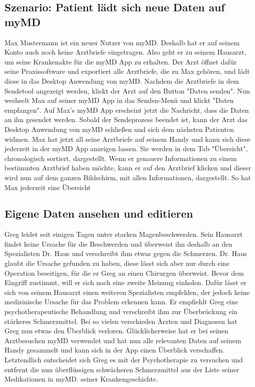\documentclass[a4paper]{scrreprt}
\begin{document}
\subsection{Szenario: Patient lädt sich neue Daten auf myMD}
Max Mustermann ist ein neuer Nutzer von myMD. Deshalb hat er auf seinem Konto auch noch keine Arztbriefe eingetragen. Also geht er zu seinem Hausarzt, um seine Krankenakte für die myMD \gls{App} zu erhalten. Der Arzt öffnet dafür seine Praxissoftware und exportiert alle Arztbriefe, die zu Max gehören, und lädt diese in das \gls{Desktop Anwendung} von myMD. Nachdem die Arztbriefe in dem Sendetool angezeigt werden, klickt der Arzt auf den Button "Daten senden". Nun wechselt Max auf seiner myMD \gls{App} in das Senden-Menü und klickt "Daten empfangen". Auf Max's myMD \gls{App} erscheint jetzt die Nachricht, dass die Daten an ihn gesendet werden. Sobald der Sendeprozess beendet ist, kann der Arzt das \gls{Desktop Anwendung} von myMD schließen und sich dem nächsten Patienten widmen. Max hat jetzt all seine Arztbriefe auf seinem Handy und kann sich diese jederzeit in der myMD \gls{App} anzeigen lassen. Sie werden in dem Tab "Übersicht", chronologisch sortiert, dargestellt. Wenn er genauere Informationen zu einem bestimmten Arztbrief haben möchte, kann er auf den Arztbrief klicken und dieser wird nun auf dem ganzen Bildschirm, mit allen Informationen, dargestellt. So hat Max jederzeit eine Übersicht

\subsection{Eigene Daten ansehen und editieren}
Greg leidet seit einigen Tagen unter starken Magenbeschwerden. Sein Hausarzt findet keine Ursache für die Beschwerden und überweist ihn deshalb an den Spezialisten Dr. Haus und verschreibt ihm etwas gegen die Schmerzen. Dr. Haus glaubt die Ursache gefunden zu haben, diese lässt sich aber nur durch eine Operation beseitigen, für die er Greg an einen Chirurgen überweist. Bevor dem Eingriff zustimmt, will er sich noch eine zweite Meinung einholen. Dafür lässt er sich von seinem Hausarzt einen weiteren Spezialisten empfehlen, der jedoch keine medizinische Ursache für das Problem erkennen kann. Er empfiehlt Greg eine psychotherapeutische Behandlung und verschreibt ihm zur Überbrückung ein stärkeres Schmerzmittel. Bei so vielen verschieden Ärzten und Diagnosen hat Greg nun etwas den Überblick verloren. Glücklicherweise hat er bei seinen Arztbesuchen myMD verwendet und hat nun alle relevanten Daten auf seinem Handy gesammelt und kann sich in der App einen Überblick verschaffen. Letztendlich entscheidet sich Greg es mit der Psychotherapie zu versuchen und entfernt die nun überflüssigen schwächeren Schmerzmittel aus der Liste seiner Medikationen in myMD. seiner Krankengeschichte.
\end{document}

